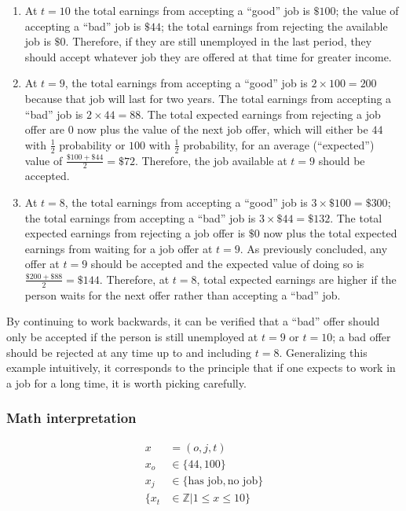 \documentclass[a4paper, 12pt]{article}
\begin{document}
\begin{enumerate}
  \item At $t = 10$ the total earnings from accepting a ``good'' job is $\$100$; the value of accepting a ``bad'' job is $\$44$; the total earnings from rejecting the available job is $\$0$. Therefore, if they are still unemployed in the last period, they should accept whatever job they are offered at that time for greater income.
  \item At $t = 9$, the total earnings from accepting a ``good'' job is $2 \times 100 = 200$ because that job will last for two years. The total earnings from accepting a ``bad'' job is $2 \times 44 = 88$. The total expected earnings from rejecting a job offer are $0$ now plus the value of the next job offer, which will either be $44$ with $\frac{1}{2}$ probability or $100$ with $\frac{1}{2}$ probability, for an average (``expected'') value of $\frac {\$100+\$44}{2}=\$72$. Therefore, the job available at $t=9$ should be accepted.
  \item At $t=8$, the total earnings from accepting a ``good'' job is $3\times \$100=\$300$; the total earnings from accepting a ``bad'' job is $3\times \$44=\$132$. The total expected earnings from rejecting a job offer is $\$0$ now plus the total expected earnings from waiting for a job offer at $t=9$. As previously concluded, any offer at $t=9$ should be accepted and the expected value of doing so is ${\frac {\$200+\$88}{2}}=\$144$. Therefore, at $t=8$, total expected earnings are higher if the person waits for the next offer rather than accepting a ``bad'' job.
\end{enumerate}


By continuing to work backwards, it can be verified that a ``bad'' offer should only be accepted if the person is still unemployed at $t=9$ or $t=10$; a bad offer should be rejected at any time up to and including $t=8$. Generalizing this example intuitively, it corresponds to the principle that if one expects to work in a job for a long time, it is worth picking carefully.

\subsubsection{Math interpretation}

\[
\begin{aligned}
  x &= (o, j, t) \\
  x_{o} &\in \{44, 100\} \\
  x_{j} &\in \{\text{has job}, \text{no job}\} \\
  \{x_{t} &\in \mathbb{Z} | 1 \leq x \leq 10\}
\end{aligned}
\]
\end{document}
